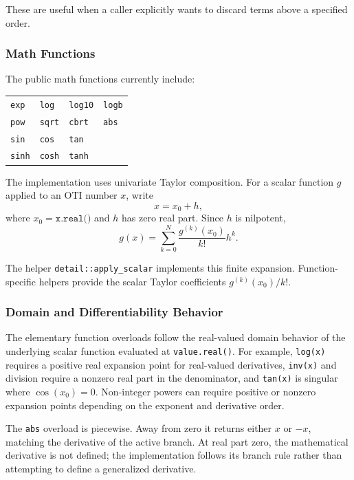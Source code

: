 \documentclass[11pt]{article}
\begin{document}
These are useful when a caller explicitly wants to discard terms above a
specified order.

\subsubsection{Math Functions}

The public math functions currently include:

\begin{center}
\begin{tabular}{llll}
\toprule
\texttt{exp} & \texttt{log} & \texttt{log10} & \texttt{logb} \\
\texttt{pow} & \texttt{sqrt} & \texttt{cbrt} & \texttt{abs} \\
\texttt{sin} & \texttt{cos} & \texttt{tan} & \\
\texttt{sinh} & \texttt{cosh} & \texttt{tanh} & \\
\bottomrule
\end{tabular}
\end{center}

The implementation uses univariate Taylor composition. For a scalar function
\(g\) applied to an OTI number \(x\), write
\[
    x = x_0 + h,
\]
where \(x_0 = \texttt{x.real()}\) and \(h\) has zero real part. Since \(h\) is
nilpotent,
\[
    g(x) =
    \sum_{k=0}^{N}
    \frac{g^{(k)}(x_0)}{k!} h^k.
\]

The helper \texttt{detail::apply\_scalar} implements this finite expansion.
Function-specific helpers provide the scalar Taylor coefficients
\(g^{(k)}(x_0)/k!\).

\subsubsection{Domain and Differentiability Behavior}

The elementary function overloads follow the real-valued domain behavior of
the underlying scalar function evaluated at \texttt{value.real()}. For
example, \texttt{log(x)} requires a positive real expansion point for
real-valued derivatives, \texttt{inv(x)} and division require a nonzero real
part in the denominator, and \texttt{tan(x)} is singular where
\(\cos(x_0)=0\). Non-integer powers can require positive or nonzero expansion
points depending on the exponent and derivative order.

The \texttt{abs} overload is piecewise. Away from zero it returns either
\(x\) or \(-x\), matching the derivative of the active branch. At real part
zero, the mathematical derivative is not defined; the implementation follows
its branch rule rather than attempting to define a generalized derivative.
\end{document}
